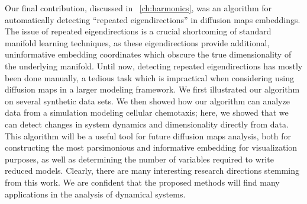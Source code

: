 Our final contribution, discussed in \chap~\ref{ch:harmonics}, was an algorithm for automatically detecting ``repeated eigendirections'' in diffusion maps embeddings.
%
The issue of repeated eigendirections is a crucial shortcoming of standard manifold learning techniques, as these eigendirections provide additional, uninformative embedding coordinates which obscure the true dimensionality of the underlying manifold.
%
Until now, detecting repeated eigendirections has mostly been done manually, a tedious task which is impractical when considering using diffusion maps in a larger modeling framework.
%
We first illustrated our algorithm on several synthetic data sets. 
%
We then showed how our algorithm can analyze data from a simulation modeling cellular chemotaxis; here, we showed that we can detect changes in system dynamics and dimensionality directly from data.
%
This algorithm will be a useful tool for future diffusion maps analysis, both for constructing the most parsimonious and informative embedding for visualization purposes, as well as determining the number of variables required to write reduced models.
%
Clearly, there are many interesting research directions stemming from this work.
%
We are confident that the proposed methods will find many applications in the analysis of dynamical systems.

